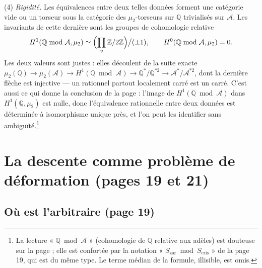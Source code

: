\documentclass[11pt,a4paper]{article}
\begin{document}
(4) \emph{Rigidité.} Les équivalences entre deux telles données forment une
catégorie vide ou un torseur sous la catégorie des $\mu_{2}$-torseurs sur
$\mathbb{Q}$ trivialisés sur $\mathcal{A}$. Les invariants de cette dernière
sont les groupes de cohomologie relative
\[
H^{1}(\mathbb{Q} \bmod \mathcal{A}, \mu_{2}) \simeq
\Bigl(\prod_{v} \mathbb{Z}/2\mathbb{Z}\Bigr)\big/(\pm 1), \qquad
H^{0}(\mathbb{Q} \bmod \mathcal{A}, \mu_{2}) = 0 .
\]
Les deux valeurs sont justes : elles découlent de la suite exacte
$\mu_{2}(\mathbb{Q}) \to \mu_{2}(\mathcal{A}) \to H^{1}(\mathbb{Q} \bmod
\mathcal{A}) \to \mathbb{Q}^{*}/\mathbb{Q}^{*2} \to
\mathcal{A}^{*}/\mathcal{A}^{*2}$, dont la dernière flèche est injective — un
rationnel partout localement carré est un carré. C'est aussi ce qui donne la
conclusion de la page : l'image de $H^{1}(\mathbb{Q} \bmod \mathcal{A})$ dans
$H^{1}(\mathbb{Q}, \mu_{2})$ est nulle, donc l'équivalence rationnelle entre
deux données est déterminée à isomorphisme unique près, et l'on peut les
identifier sans ambiguïté.\footnote{La lecture « $\mathbb{Q} \bmod
\mathcal{A}$ » (cohomologie de $\mathbb{Q}$ relative aux adèles) est douteuse
sur la page ; elle est confortée par la notation
« $S_{\mathrm{zar}} \bmod S_{\mathrm{cris}}$ » de la page 19, qui est du même
type. Le terme médian de la formule, illisible, est omis.}

\section*{La descente comme problème de déformation (pages 19 et 21)}

\subsection*{Où est l'arbitraire (page 19)}
\end{document}
